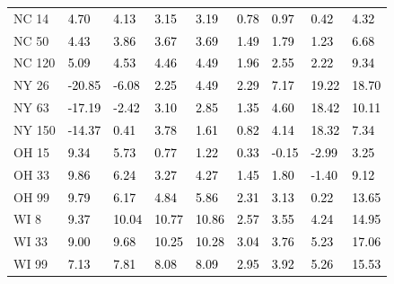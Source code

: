 \begin{tabular}{lllllllll}
NC 14 & \textcolor{black}{ 4.70 } & \textcolor{black}{ 4.13 } & \textcolor{black}{ 3.15 } & \textcolor{black}{ 3.19 } & \textcolor{black}{ 0.78 } & \textcolor{black}{ 0.97 } & \textcolor{black}{ 0.42 } & \textcolor{black}{ 4.32 } \\
NC 50 & \textcolor{black}{ 4.43 } & \textcolor{black}{ 3.86 } & \textcolor{black}{ 3.67 } & \textcolor{black}{ 3.69 } & \textcolor{black}{ 1.49 } & \textcolor{black}{ 1.79 } & \textcolor{black}{ 1.23 } & \textcolor{black}{ 6.68 } \\
NC 120 & \textcolor{black}{ 5.09 } & \textcolor{black}{ 4.53 } & \textcolor{black}{ 4.46 } & \textcolor{black}{ 4.49 } & \textcolor{black}{ 1.96 } & \textcolor{black}{ 2.55 } & \textcolor{black}{ 2.22 } & \textcolor{black}{ 9.34 } \\
NY 26 & \textcolor{black}{ -20.85 } & \textcolor{black}{ -6.08 } & \textcolor{black}{ 2.25 } & \textcolor{black}{ 4.49 } & \textcolor{black}{ 2.29 } & \textcolor{black}{ 7.17 } & \textcolor{black}{ 19.22 } & \textcolor{black}{ 18.70 } \\
NY 63 & \textcolor{black}{ -17.19 } & \textcolor{black}{ -2.42 } & \textcolor{black}{ 3.10 } & \textcolor{black}{ 2.85 } & \textcolor{black}{ 1.35 } & \textcolor{black}{ 4.60 } & \textcolor{black}{ 18.42 } & \textcolor{black}{ 10.11 } \\
NY 150 & \textcolor{black}{ -14.37 } & \textcolor{black}{ 0.41 } & \textcolor{black}{ 3.78 } & \textcolor{black}{ 1.61 } & \textcolor{black}{ 0.82 } & \textcolor{black}{ 4.14 } & \textcolor{black}{ 18.32 } & \textcolor{black}{ 7.34 } \\
OH 15 & \textcolor{black}{ 9.34 } & \textcolor{black}{ 5.73 } & \textcolor{black}{ 0.77 } & \textcolor{black}{ 1.22 } & \textcolor{black}{ 0.33 } & \textcolor{black}{ -0.15 } & \textcolor{black}{ -2.99 } & \textcolor{black}{ 3.25 } \\
OH 33 & \textcolor{black}{ 9.86 } & \textcolor{black}{ 6.24 } & \textcolor{black}{ 3.27 } & \textcolor{black}{ 4.27 } & \textcolor{black}{ 1.45 } & \textcolor{black}{ 1.80 } & \textcolor{black}{ -1.40 } & \textcolor{black}{ 9.12 } \\
OH 99 & \textcolor{black}{ 9.79 } & \textcolor{black}{ 6.17 } & \textcolor{black}{ 4.84 } & \textcolor{black}{ 5.86 } & \textcolor{black}{ 2.31 } & \textcolor{black}{ 3.13 } & \textcolor{black}{ 0.22 } & \textcolor{black}{ 13.65 } \\
WI 8 & \textcolor{black}{ 9.37 } & \textcolor{black}{ 10.04 } & \textcolor{black}{ 10.77 } & \textcolor{black}{ 10.86 } & \textcolor{black}{ 2.57 } & \textcolor{black}{ 3.55 } & \textcolor{black}{ 4.24 } & \textcolor{black}{ 14.95 } \\
WI 33 & \textcolor{black}{ 9.00 } & \textcolor{black}{ 9.68 } & \textcolor{black}{ 10.25 } & \textcolor{black}{ 10.28 } & \textcolor{black}{ 3.04 } & \textcolor{black}{ 3.76 } & \textcolor{black}{ 5.23 } & \textcolor{black}{ 17.06 } \\
WI 99 & \textcolor{black}{ 7.13 } & \textcolor{black}{ 7.81 } & \textcolor{black}{ 8.08 } & \textcolor{black}{ 8.09 } & \textcolor{black}{ 2.95 } & \textcolor{black}{ 3.92 } & \textcolor{black}{ 5.26 } & \textcolor{black}{ 15.53 } \\
\bottomrule
\end{tabular}
